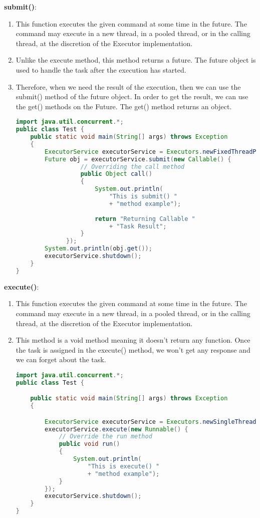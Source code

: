 \documentclass[11pt]{article}
\begin{document}
\begin{enumerate}
	      \textbf{submit()}:
	      \begin{enumerate}
		      \item This function executes the given command at some time in the future. The command may execute in a new thread, in a pooled thread, or in the calling thread, at the discretion of the Executor implementation.
		      \item Unlike the execute method, this method returns a future. The future object is used to handle the task after the execution has started.
		      \item Therefore, when we need the result of the execution, then we can use the submit() method of the future object. In order to get the result, we can use the get() methods on the Future. The get() method returns an object.
		            \begin{lstlisting}[language=Java]
				import java.util.concurrent.*;
public class Test {
    public static void main(String[] args) throws Exception
    {
        ExecutorService executorService = Executors.newFixedThreadPool(1);
        Future obj = executorService.submit(new Callable() {
                  // Overriding the call method
                  public Object call()
                  {
                      System.out.println(
                          "This is submit() "
                          + "method example");
 
                      return "Returning Callable "
                          + "Task Result";
                  }
              });
        System.out.println(obj.get());
        executorService.shutdown();
    }
}
			  \end{lstlisting}
	      \end{enumerate}
	      \textbf{execute()}:
	      \begin{enumerate}
		      \item This function executes the given command at some time in the future. The command may execute in a new thread, in a pooled thread, or in the calling thread, at the discretion of the Executor implementation.
		      \item This method is a void method meaning it doesn't return any function. Once the task is assigned in the execute() method, we won't get any response and we can forget about the task.
		            \begin{lstlisting}[language=Java]				
import java.util.concurrent.*;
public class Test {

	public static void main(String[] args) throws Exception
	{

		ExecutorService executorService = Executors.newSingleThreadExecutor();
		executorService.execute(new Runnable() {
			// Override the run method
			public void run()
			{
				System.out.println(
					"This is execute() "
					+ "method example");
			}
		});				
		executorService.shutdown();
	}
}

			  \end{lstlisting}
	      \end{enumerate}

\end{enumerate}
\end{document}
